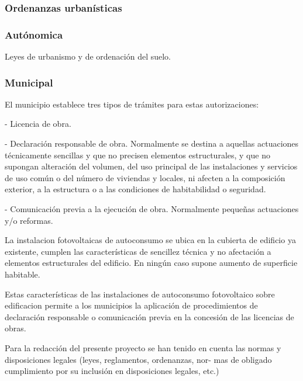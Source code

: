 \documentclass{article}
\begin{document}
\subsubsection{Ordenanzas urbanísticas}

\subsubsection{Autónomica}

Leyes de urbanismo y de ordenación del suelo.

\subsubsection{Municipal}

El municipio  establece tres tipos de trámites para estas autorizaciones:

- Licencia de obra.

- Declaración responsable de obra.
Normalmente se destina a aquellas actuaciones técnicamente sencillas y que no precisen
elementos estructurales, y que no supongan alteración del volumen, del uso principal de
las instalaciones y servicios de uso común o del número de viviendas y locales, ni afecten
a la composición exterior, a la estructura o a las condiciones de habitabilidad o seguridad.

- Comunicación previa a la ejecución de obra.
Normalmente pequeñas actuaciones y/o reformas.

La instalacion fotovoltaicas de autoconsumo se ubica en la cubierta de edificio ya existente, cumplen las características de sencillez técnica y no afectación a elementos estructurales del edificio. En ningún caso supone aumento de superficie habitable.

Estas características de las instalaciones de autoconsumo fotovoltaico sobre edificacion permite a los municipios la aplicación de procedimientos de declaración responsable o comunicación previa en la concesión de las licencias de obras.

Para la redacción del presente proyecto se han tenido en cuenta las normas y disposiciones legales (leyes, reglamentos, ordenanzas, nor-
mas de obligado cumplimiento por su inclusión en disposiciones legales, etc.)



\end{document}
